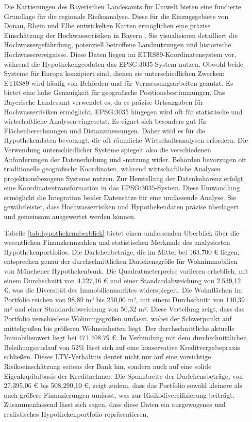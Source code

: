Die Kartierungen des Bayerischen Landesamts für Umwelt bieten eine fundierte Grundlage für die regionale Risikoanalyse. Diese für die Einzugsgebiete von Donau, Rhein und Elbe entwickelten Karten ermöglichen eine präzise Einschätzung der Hochwasserrisiken in Bayern \parencite{LfU_Bayern}. Sie visualisieren detailliert die Hochwassergefährdung, potenziell betroffene Landnutzungen und historische Hochwasserereignisse.
Diese Daten liegen im ETRS89-Koordinatensystem vor, während die Hypothekengeodaten das EPSG:3035-System nutzen. Obwohl beide Systeme für Europa konzipiert sind, dienen sie unterschiedlichen Zwecken:
ETRS89 wird häufig von Behörden und für Vermessungsarbeiten genutzt. Es bietet eine hohe Genauigkeit für geografische Positionsbestimmungen. Das Bayerische Landesamt verwendet es, da es präzise Ortsangaben für Hochwasserrisiken ermöglicht.
EPSG:3035 hingegen wird oft für statistische und wirtschaftliche Analysen eingesetzt. Es eignet sich besonders gut für Flächenberechnungen und Distanzmessungen. Daher wird es für die Hypothekendaten bevorzugt, die oft räumliche Wirtschaftsanalysen erfordern.
Die Verwendung unterschiedlicher Systeme spiegelt also die verschiedenen Anforderungen der Datenerhebung und -nutzung wider. Behörden bevorzugen oft traditionelle geografische Koordinaten, während wirtschaftliche Analysen projektionsbezogene Systeme nutzen.
Zur Herstellung der Datenkohärenz erfolgt eine Koordinatentransformation in das EPSG:3035-System. Diese Umwandlung ermöglicht die Integration beider Datensätze für eine umfassende Analyse. Sie gewährleistet, dass Hochwasserrisiken und Hypothekendaten präzise überlagert und gemeinsam ausgewertet werden können.

Tabelle \ref{tab:hypothekenuberblick} bietet einen umfassenden Überblick über die wesentlichen Finanzkennzahlen und statistischen Merkmale des analysierten Hypothekenportfolios. Die Darlehenbeträge, die im Mittel bei 163.700 € liegen, entsprechen genau der durchschnittlichen Darlehensgröße für Wohnimmobilien von Münchener Hypothekenbank. Die Quadratmeterpreise variieren erheblich, mit einem Durchschnitt von 4.727,16 € und einer Standardabweichung von 2.539,12 €, was die Diversität des Immobilienmarktes widerspiegelt. Die Wohnflächen im Portfolio reichen von 98,89 m² bis 250,00 m², mit einem Durchschnitt von 140,39 m² und einer Standardabweichung von 50,32 m². Diese Verteilung zeigt, dass das Portfolio verschiedene Wohnungsgrößen umfasst, wobei der Schwerpunkt auf mittelgroßen bis größeren Wohneinheiten liegt. Der durchschnittliche aktuelle Immobilienwert liegt bei 471.408,79 €. In Verbindung mit dem durchschnittlichen Beleihungsauslauf von 52\% lässt sich auf eine konservative Kreditvergabepraxis schließen. Dieses LTV-Verhältnis deutet nicht nur auf eine vorsichtige Risikoeinschätzung seitens der Bank hin, sondern auch auf eine solide Eigenkapitalbasis der Kreditnehmer. Die Spannbreite der Darlehensbeträge, von 27.395,06 € bis 508.290,10 €, zeigt zudem, dass das Portfolio sowohl kleinere als auch größere Finanzierungen umfasst, was zur Risikodiversifizierung beiträgt. Zusammenfassend lässt sich sagen, dass diese Daten ein ausgewogenes und realistisches Hypothekenportfolio repräsentieren,

